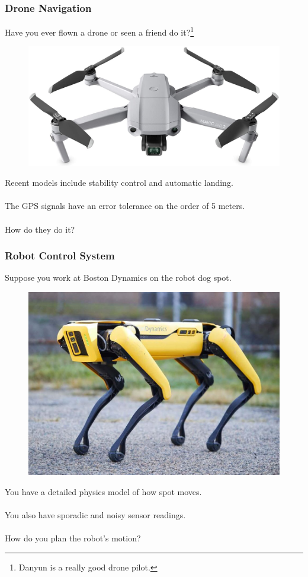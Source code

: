 \documentclass{beamer}
\begin{document}
\begin{frame}
\frametitle{Drone Navigation}
Have you ever flown a drone or seen a friend do it?\footnote{Danyun is a really good drone pilot.}
\begin{figure}
\includegraphics[scale=.12]{dji_mavic_air.jpg}
\end{figure}
Recent models include stability control and automatic landing. \\~\\
The GPS signals have an error tolerance on the order of 5 meters. \\~\\
How do they do it?
\end{frame}

\begin{frame}
\frametitle{Robot Control System}
Suppose you work at Boston Dynamics on the robot dog spot.
\begin{figure}
\includegraphics[scale=.12]{boston_dynamics_spot.jpg}
\end{figure}
You have a detailed physics model of how spot moves. \\~\\
You also have sporadic and noisy sensor readings. \\~\\
How do you plan the robot's motion?
\end{frame}
\end{document}
